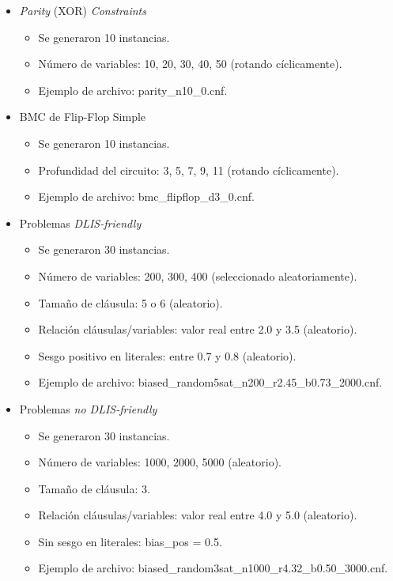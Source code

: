 \begin{itemize}
\begin{itemize}
    \end{itemize}
    \item \textit{Parity} (XOR) \textit{Constraints}
    \begin{itemize}
        \item Se generaron 10 instancias.
        \item Número de variables: 10, 20, 30, 40, 50 (rotando cíclicamente).
        \item Ejemplo de archivo: parity\_n10\_0.cnf.
    \end{itemize}
    \item BMC de Flip-Flop Simple
    \begin{itemize}
        \item Se generaron 10 instancias.
        \item Profundidad del circuito: 3, 5, 7, 9, 11 (rotando cíclicamente).
        \item Ejemplo de archivo: bmc\_flipflop\_d3\_0.cnf.
    \end{itemize}
    \item Problemas \textit{DLIS-friendly}
    \begin{itemize}
        \item Se generaron 30 instancias.
        \item Número de variables: 200, 300, 400 (seleccionado aleatoriamente).
        \item Tamaño de cláusula: 5 o 6 (aleatorio).
        \item Relación cláusulas/variables: valor real entre 2.0 y 3.5 (aleatorio).
        \item Sesgo positivo en literales: entre 0.7 y 0.8 (aleatorio).
        \item Ejemplo de archivo: biased\_random5sat\_n200\_r2.45\_b0.73\_2000.cnf.
    \end{itemize}
    \item Problemas \textit{no DLIS-friendly}
    \begin{itemize}
        \item Se generaron 30 instancias.
        \item Número de variables: 1000, 2000, 5000 (aleatorio).
        \item Tamaño de cláusula: 3.
        \item Relación cláusulas/variables: valor real entre 4.0 y 5.0 (aleatorio).
        \item Sin sesgo en literales: bias\_pos = 0.5.
        \item Ejemplo de archivo: biased\_random3sat\_n1000\_r4.32\_b0.50\_3000.cnf.
    \end{itemize}
\end{itemize}


